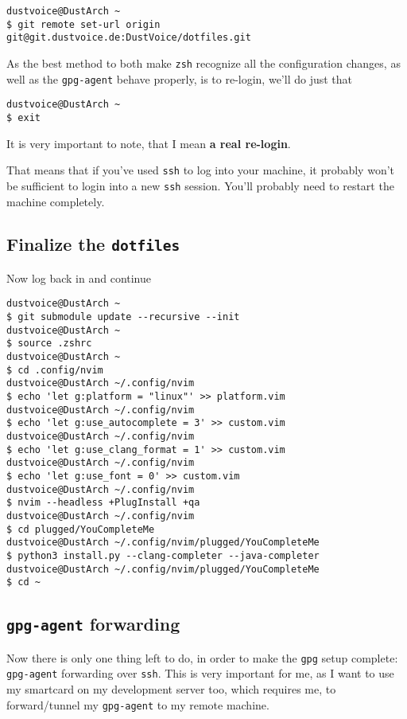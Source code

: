 \documentclass[9pt]{report}
\newenvironment{WARNING}
{\begin{tcolorbox}[colback=admonitionBG,coltitle=draculaBG,colframe=draculaOrange,colbacktitle=draculaOrange,title=WARNING]}
{\end{tcolorbox}}
\begin{document}
\begin{verbatim}
dustvoice@DustArch ~
$ git remote set-url origin git@git.dustvoice.de:DustVoice/dotfiles.git
\end{verbatim}

As the best method to both make \texttt{zsh} recognize all the configuration changes, as well as the \texttt{gpg-agent} behave properly, is to re-login, we’ll do just that


\begin{verbatim}
dustvoice@DustArch ~
$ exit
\end{verbatim}

\begin{WARNING}
    It is very important to note, that I mean \textbf{a real re-login}.


    That means that if you’ve used \texttt{ssh} to log into your machine, it probably won’t be sufficient to login into a new \texttt{ssh} session.
    You’ll probably need to restart the machine completely.

\end{WARNING}

\newpage

\hypertarget{x-finalize-the-dotfiles}{\subsection{Finalize the \texttt{dotfiles}}}
Now log back in and continue


\begin{verbatim}
dustvoice@DustArch ~
$ git submodule update --recursive --init
dustvoice@DustArch ~
$ source .zshrc
dustvoice@DustArch ~
$ cd .config/nvim
dustvoice@DustArch ~/.config/nvim
$ echo 'let g:platform = "linux"' >> platform.vim
dustvoice@DustArch ~/.config/nvim
$ echo 'let g:use_autocomplete = 3' >> custom.vim
dustvoice@DustArch ~/.config/nvim
$ echo 'let g:use_clang_format = 1' >> custom.vim
dustvoice@DustArch ~/.config/nvim
$ echo 'let g:use_font = 0' >> custom.vim
dustvoice@DustArch ~/.config/nvim
$ nvim --headless +PlugInstall +qa
dustvoice@DustArch ~/.config/nvim
$ cd plugged/YouCompleteMe
dustvoice@DustArch ~/.config/nvim/plugged/YouCompleteMe
$ python3 install.py --clang-completer --java-completer
dustvoice@DustArch ~/.config/nvim/plugged/YouCompleteMe
$ cd ~
\end{verbatim}


\newpage

\hypertarget{x-gpg-agent-forwarding}{\subsection{\texttt{gpg-agent} forwarding}}
Now there is only one thing left to do, in order to make the \texttt{gpg} setup complete: \texttt{gpg-agent} forwarding over \texttt{ssh}.
This is very important for me, as I want to use my smartcard on my development server too, which requires me, to forward/tunnel my \texttt{gpg-agent} to my remote machine.
\end{document}
